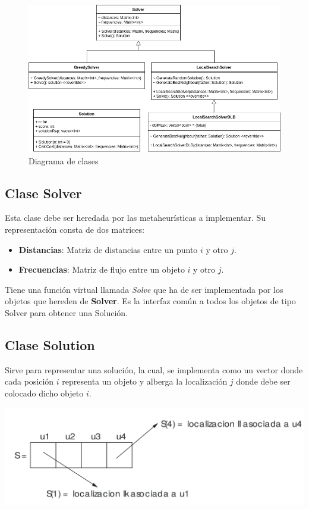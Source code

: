 \documentclass[a4paper, 12pt]{article}
\begin{document}
   \vspace*{0cm}
   \begin{figure}[H]
      \centering
      \includegraphics[scale=0.5]{clases}
      \caption{Diagrama de clases}
   \end{figure}
   
   \subsection{Clase Solver}
   Esta clase debe ser heredada por las metaheurísticas a implementar. Su representación consta de dos matrices:
   \begin{itemize}
      \item \textbf{Distancias}: Matriz de distancias entre un punto $i$ y otro $j$.
      \item \textbf{Frecuencias}: Matriz de flujo entre un objeto $i$ y otro $j$. 
   \end{itemize}
   Tiene una función virtual llamada \textit{Solve} que ha de ser implementada por los objetos que hereden de \textbf{Solver}. Es la interfaz común a todos los objetos de tipo Solver para obtener una Solución.

   
   \newpage
   \subsection{Clase Solution}
   Sirve para representar una solución, la cual, se implementa como un vector donde cada posición $i$ representa un objeto y alberga la localización $j$ donde debe ser colocado dicho objeto $i$. 
   
   \begin{center}
      \includegraphics[scale=0.14]{solRep}
   \end{center}
   
\end{document}
